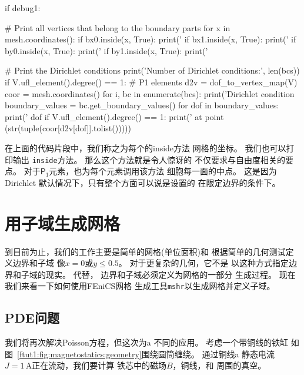\begin{python}
if debug1:

    # Print all vertices that belong to the boundary parts
    for x in mesh.coordinates():
        if bx0.inside(x, True): print('%
        if bx1.inside(x, True): print('%
        if by0.inside(x, True): print('%
        if by1.inside(x, True): print('%

    # Print the Dirichlet conditions
    print('Number of Dirichlet conditions:', len(bcs))
    if V.ufl_element().degree() == 1:  # P1 elements
        d2v = dof_to_vertex_map(V)
        coor = mesh.coordinates()
        for i, bc in enumerate(bcs):
            print('Dirichlet condition %
            boundary_values = bc.get_boundary_values()
            for dof in boundary_values:
                print('   dof %
                if V.ufl_element().degree() == 1:
                    print('    at point %
                          (str(tuple(coor[d2v[dof]].tolist()))))
\end{python}

\begin{notice}
在上面的代码片段中，我们称之为每个的inside方法
网格的坐标。 我们也可以打印输出
\texttt{inside}方法。 那么这个方法就是令人惊讶的
不仅要求与自由度相关的要点。
对于$\mathsf{P}_1$元素，也为每个元素调用该方法
细胞每一面的中点。 这是因为Dirichlet
默认情况下，只有整个方面可以说是设置的
在限定边界的条件下。
\end{notice}

\section{用子域生成网格}

到目前为止，我们的工作主要是简单的网格(单位面积)和
根据简单的几何测试定义边界和子域
像$x = 0$或$y \leq 0.5$。 对于更复杂的几何，它不是
以这种方式指定边界和子域的现实。 代替，
边界和子域必须定义为网格的一部分
生成过程。 现在我们来看一下如何使用FEniCS网格
生成工具\texttt{mshr}以生成网格并定义子域。

\subsection{PDE问题}


我们将再次解决Poisson方程，但这次为a
不同的应用。 考虑一个带铜线的铁缸
如图~\ref{ftut1:fig:magnetostatics:geometry}围绕圆筒缠绕。 通过铜线a
静态电流$J = 1\,\mathrm{A}$正在流动，我们要计算
铁芯中的磁场$B$，铜线，和
周围的真空。


